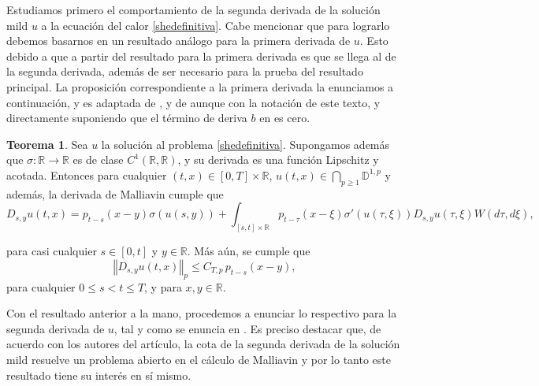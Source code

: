 \documentclass[letterpaper,twoside,12pt]{book}
\newcommand{\R}{\mathbb{R}}
\newcommand{\D}{\mathbb{D}}
\newcommand{\1}{\mathds{1}}
\renewcommand{\to}{\rightarrow}
\newcommand{\norm}[1]{\left\Vert #1 \right\Vert}
\theoremstyle{definition}
\theoremstyle{definition}
\newtheorem{teo}{Teorema}
\theoremstyle{remark}
\theoremstyle{definition}
\theoremstyle{definition}
\theoremstyle{definition}
\theoremstyle{definition}
\theoremstyle{definition}
\begin{document}
Estudiamos primero el comportamiento de la segunda derivada de la solución mild $u$ a la ecuación del calor \eqref{shedefinitiva}. Cabe mencionar que para lograrlo debemos basarnos en un resultado análogo para la primera derivada de $u$. Esto debido a que a partir del resultado para la primera derivada es que se llega al de la segunda derivada, además de ser necesario para la prueba del resultado principal. La proposición correspondiente a la primera derivada la enunciamos a continuación, y es adaptada de \cite[proposición 5.1]{Nualart2007}, y de \cite[sección 4.1]{KUZGUN202268} aunque con la notación de este texto, y directamente suponiendo que el término de deriva $b$ en \cite{Nualart2007} es cero.

\begin{teo}\label{teocota1eraderivada}
   Sea $u$ la solución al problema \eqref{shedefinitiva}. Supongamos además que $\sigma:\R\to\R$ es de clase $C^1(\R,\R)$, y su derivada es una función Lipschitz y acotada. Entonces para cualquier $(t,x)\in [0,T]\times\R$, $u(t,x)\in\bigcap_{p\geq1}\D^{1,p}$ y además, la derivada de Malliavin cumple que 
   \begin{equation}\label{formula1eraderivada}
      D_{s,y}u(t,x)=p_{t-s}(x-y)\sigma(u(s,y))+ \int_{[s,t]\times\R} p_{t-\tau}(x-\xi)\sigma'(u(\tau,\xi))D_{s,y}u(\tau,\xi)W(d\tau,d\xi),
   \end{equation}
   
   para casi cualquier $s\in [0,t]$ y $y\in \R$. Más aún, se cumple que 
   \begin{equation}\label{cota1eraderivada} 
      \norm{D_{s,y}u(t,x)}_{p}\leq C_{T,p \ }p_{t-s}(x-y),
   \end{equation}
   para cualquier $0\leq s<t\leq T$, y para $x,y\in \R$.
 \end{teo}
Con el resultado anterior a la mano, procedemos a enunciar lo respectivo para la segunda derivada de $u$, tal y como se enuncia en \cite{KUZGUN202268}. Es preciso destacar que, de acuerdo con los autores del artículo, la cota de la segunda derivada de la solución mild resuelve un problema abierto en el cálculo de Malliavin y por lo tanto este resultado tiene su interés en sí mismo.
\end{document}

